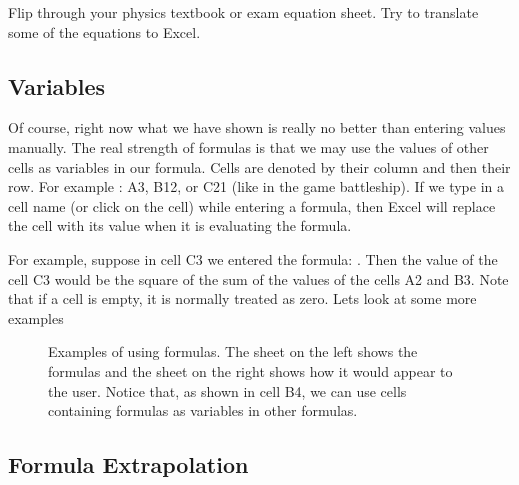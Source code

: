 \documentclass[10pt]{article}
\begin{document}
\begin{exercise}
	Flip through your physics textbook or exam equation sheet.
	Try to translate some of the equations to Excel. 
\end{exercise}

\subsection{Variables}%
\label{sub:variables}

Of course, right now what we have shown is really no better than entering values manually.
The real strength of formulas is that we may use the values of other cells as variables in our formula.
Cells are denoted by their column and then their row.
For example : A3, B12, or C21 (like in the game battleship).
If we type in a cell name (or click on the cell) while entering a formula, then Excel will replace the cell with its value when it is evaluating the formula.

For example, suppose in cell C3 we entered the formula: . 
Then the value of the cell C3 would be the square of the sum of the values of the cells A2 and B3. Note that if a cell is empty, it is normally treated as zero. Lets look at some more examples

\begin{figure}[htpb]
	\centering
\begin{minipage}{0.4\textwidth}
	\begin{sheetpic}
	\end{sheetpic}
\end{minipage}
\begin{minipage}{0.4\textwidth}
	\begin{sheetpic}
		\etab[5]{A-B}
		\celtxt[c]{A}{1}{3}
		\celtxt[c]{A}{2}{6}
		\celtxt[c]{B}{4}{39}
	\end{sheetpic}
\end{minipage}
	\caption{Examples of using formulas.
	The sheet on the left shows the formulas and the sheet on the right shows how it would appear to the user.
Notice that, as shown in cell B4, we can use cells containing formulas as variables in other formulas.
}%
	\label{fig:forumula_example_1}
\end{figure}

\subsection{Formula Extrapolation}%
\label{sub:formula_extrapolation}
\end{document}
